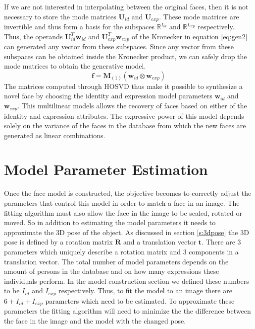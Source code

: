 \documentclass[11pt,a4paper]{report}
\begin{document}
If we are not interested in interpolating between the original faces, then it is
not necessary to store the mode matrices $\mathbf{U}_{id}$ and
$\mathbf{U}_{exp}$. These mode matrices are invertible and thus form a
basis for the subspaces $\mathbb{R}^{I_{id}}$ and $\mathbb{R}^{I_{exp}}$
respectively. Thus, the operands $\mathbf{U}_{id}^T\mathbf{w}_{id}$ and 
$\mathbf{U}_{exp}^T\mathbf{w}_{exp}$ of the Kronecker in equation \ref{eq:gen2}
can generated any vector from these subspaces. Since any vector from these
subspaces can be obtained inside the Kronecker product, we can safely drop the mode matrices to obtain the generative model.
\begin{equation}\label{eq:gen4}
\mathbf{f} = \mathbf{M}_{(1)}(\mathbf{w}_{id} \otimes \mathbf{w}_{exp})
\end{equation}
The matrices computed through HOSVD thus make it possible to synthesize a novel face by
choosing the identity and expression model parameters $\mathbf{w}_{id}$ and
$\mathbf{w}_{exp}$. This multilinear models allows the recovery of faces based
on either of the identity and expression attributes. The expressive power of this model depends solely on the
variance of the faces in the database from which the new faces are generated as linear
combinations. 

\section{Model Parameter Estimation}
Once the face model is constructed, the objective becomes to correctly adjust the
parameters that control this model in order to match a face in an
image. The fitting algorithm must also allow the face in the image to be scaled,
rotated or moved. So in addition to estimating the model parameters it needs to
approximate the 3D pose of the object. As discussed in section \ref{s:3dpose}
the 3D pose is defined by a rotation matrix $\mathbf{R}$ and a translation
vector $\mathbf{t}$. There are 3 parameters which uniquely describe a rotation
matrix and 3 components in a translation vector. The total number of model parameters depends on
the amount of persons in the database and on how many expressions these
individuals perform. In the model construction section we defined these numbers
to be $I_{id}$ and $I_{exp}$ respectively. Thus, to fit the model to an image there
are $6+I_{id}+I_{exp}$ parameters which need to be estimated. To approximate
these parameters the fitting algorithm will need to minimize the the difference
between the face in the image and the model with the changed pose.
\end{document}
